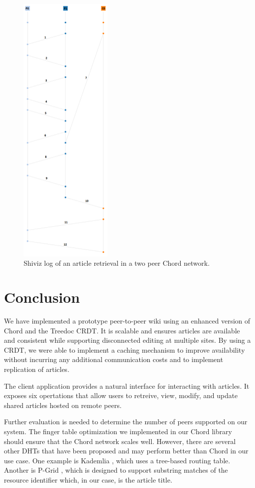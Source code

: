 \documentclass[twocolumn]{article}
\begin{document}
\begin{figure}[tbh!]
  \centering
  \includegraphics[width=0.4\textwidth]{report/images/shiviz_article1}
  \caption{Shiviz log of an article retrieval in a two peer Chord network. \label{fig:shiviz_article}}
\end{figure}


\section{Conclusion}
We have implemented a prototype peer-to-peer wiki using an enhanced version of Chord and the Treedoc CRDT. It is scalable and ensures articles are available and consistent while supporting disconnected editing at multiple sites. By using a CRDT, we were able to implement a caching mechanism to improve availability without incurring any additional communication costs and to implement replication of articles.

The client application provides a natural interface for interacting with articles. It exposes six opertations that allow users to retreive, view, modify, and update shared articles hosted on remote peers.

Further evaluation is needed to determine the number of peers supported on our system. The finger table optimization we implemented in our Chord library should ensure that the Chord network scales well. However, there are several other DHTs that have been proposed and may perform better than Chord in our use case. One example is Kademlia \cite{kademlia}, which uses a tree-based routing table. Another is P-Grid \cite{pgrid}, which is designed to support substring matches of the resource identifier which, in our case, is the article title.



\end{document}
